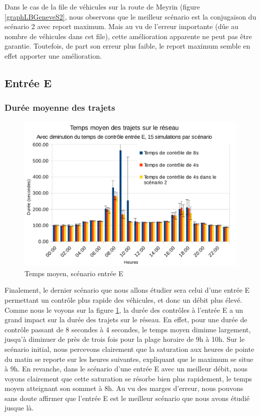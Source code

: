 \documentclass[a4paper,11pt, titlepage]{extarticle}
\begin{document}
Dans le cas de la file de véhicules sur la route de Meyrin (figure \ref{graphLBGeneveS2}, nous observons que le meilleur scénario est la conjugaison du scénario 2 avec report maximum. Mais au vu de l'erreur importante (dûe au nombre de véhicules dans cet file), cette amélioration apparente ne peut pas être garantie. Toutefois, de part son erreur plus faible, le report maximum semble en effet apporter une amélioration.

\newpage

\subsection{Entrée E}

\subsubsection{Durée moyenne des trajets}

\begin{figure}[!h]
  \begin{center}
    \includegraphics[width=13cm]{graphiques/temps_entreeE.png}
  \end{center}
  \vspace{-0.8cm}
  \caption{Temps moyen, scénario entrée E}
  \label{graphTempsE}
\end{figure}

Finalement, le dernier scénario que nous allons étudier sera celui d'une entrée E permettant un contrôle plus rapide des véhicules, et donc un débit plus élevé. Comme nous le voyons sur la figure \ref{graphTempsE}, la durée des contrôles à l'entrée E a un grand impact sur la durée des trajets sur le réseau. En effet, pour une durée de contrôle passant de 8 secondes à 4 secondes, le temps moyen diminue largement, jusqu'à diminuer de près de trois fois pour la plage horaire de 9h à 10h. Sur le scénario initial, nous percevons clairement que la saturation aux heures de pointe du matin se reporte sur les heures suivantes, expliquant que le maximum se situe à 9h. En revanche, dans le scénario d'une entrée E avec un meilleur débit, nous voyons clairement que cette saturation se résorbe bien plus rapidement, le temps moyen atteignant son sommet à 8h. Au vu des marges d'erreur, nous pouvons sans doute affirmer que l'entrée E est le meilleur scénario que nous avons étudié jusque là.
\end{document}
